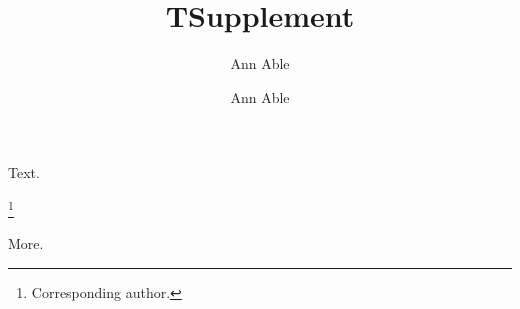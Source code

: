 \documentclass[aps,prl]{revtex4-2}
\begin{document}
\title{T}
\author{Ann Able}
\maketitle
Text.
\clearpage
\title{Supplement}
\author{Ann Able}
\thanks{Corresponding author.}
\maketitle
More.
\end{document}

